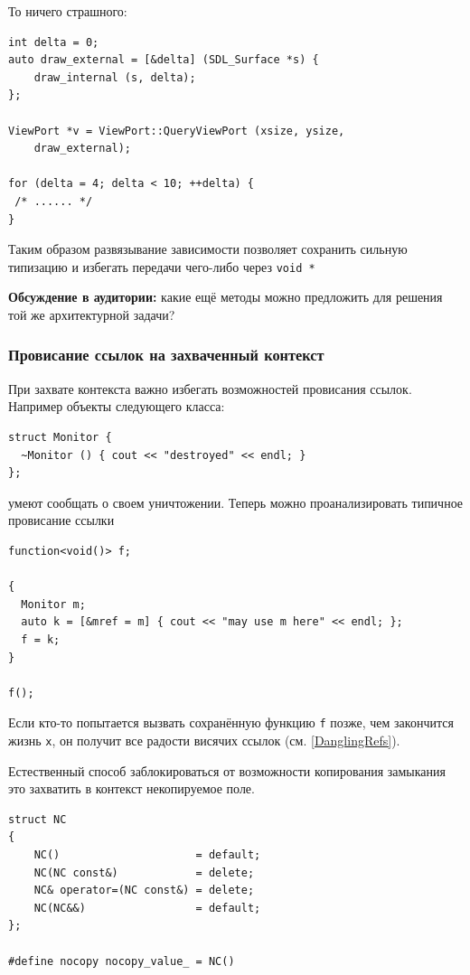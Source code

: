 \documentclass[a4paper,12pt,oneside]{article}
\begin{document}
То ничего страшного:

\begin{lstlisting}
int delta = 0;
auto draw_external = [&delta] (SDL_Surface *s) { 
    draw_internal (s, delta); 
};

ViewPort *v = ViewPort::QueryViewPort (xsize, ysize, 
    draw_external);

for (delta = 4; delta < 10; ++delta) {
 /* ...... */
}
\end{lstlisting}

Таким образом развязывание зависимости позволяет сохранить сильную типизацию и избегать передачи чего-либо через \lstinline!void *!

\textbf{Обсуждение в аудитории:} какие ещё методы можно предложить для решения той же архитектурной задачи?

\subsubsection{Провисание ссылок на захваченный контекст}\label{DanglingContext}

При захвате контекста важно избегать возможностей провисания ссылок. Например объекты следующего класса:

\begin{lstlisting}
struct Monitor {
  ~Monitor () { cout << "destroyed" << endl; }
};
\end{lstlisting}

умеют сообщать о своем уничтожении. Теперь можно проанализировать типичное провисание ссылки

\begin{lstlisting}
function<void()> f;

{
  Monitor m;
  auto k = [&mref = m] { cout << "may use m here" << endl; };
  f = k;
} 

f();
\end{lstlisting}

Если кто-то попытается вызвать сохранённую функцию \lstinline!f! позже, чем закончится жизнь \lstinline!x!, он получит все радости висячих ссылок (см. \ref{DanglingRefs}).

Естественный способ заблокироваться от возможности копирования замыкания это захватить в контекст некопируемое поле.

\begin{lstlisting}
struct NC
{
    NC()                     = default;
    NC(NC const&)            = delete;
    NC& operator=(NC const&) = delete;
    NC(NC&&)                 = default;
};

#define nocopy nocopy_value_ = NC()
\end{lstlisting}
\end{document}
